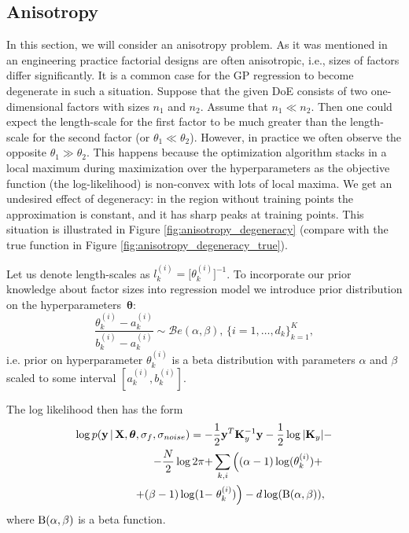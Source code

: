 \subsection{Anisotropy}
In this section, we will consider an anisotropy problem.
As it was mentioned in an engineering practice factorial designs are
often anisotropic, i.e., sizes of factors differ significantly.
It is a common case for the GP regression to become degenerate in such a situation.
Suppose that the given DoE consists of two one-dimensional factors
with sizes $n_1$ and $n_2$.
Assume that $n_1 \ll n_2$.
Then one could expect the length-scale for the first factor to be much greater than
the length-scale for the second factor (or $\theta_1 \ll \theta_2$).
However, in practice we often observe the opposite $\theta_1 \gg \theta_2$.
This happens because the optimization algorithm stacks in a local maximum during maximization over
the hyperparameters as the objective function (the log-likelihood) is non-convex with lots of local maxima.
We get an undesired effect of degeneracy:
in the region without training points the approximation is constant, and it has sharp peaks at training points.
This situation is illustrated in Figure \ref{fig:anisotropy_degeneracy}
(compare with the true function in Figure \ref{fig:anisotropy_degeneracy_true}).

Let us denote length-scales as $l_k^{(i)} = \big [\theta_k^{(i)} \big ]^{-1}$.
To incorporate our prior knowledge about factor sizes into regression model
we introduce prior distribution on the hyperparameters~$\boldsymbol{\theta}$:
\begin{equation}
  \label{eq:prior}
  \frac{\theta_k^{(i)} - a_k^{(i)}}{b_k^{(i)} - a_k^{(i)}} \sim \mathcal{B}e(\alpha, \beta), \, \{ i = 1, \ldots, d_k\}_{k = 1}^K,
\end{equation}
i.e. prior on hyperparameter $\theta_k^{(i)}$ is a beta distribution with parameters $\alpha$
and $\beta$ scaled to some interval $\left [a_k^{(i)}, b_k^{(i)} \right ]$.

The log likelihood then has the form
\begin{equation}
  \label{eq:loglikelihood_prior}
  \begin{split}
    \log p(\mathbf{y} \, | \, \mathbf{X}, \boldsymbol{\theta}, \sigma_f, \sigma_{noise}) = -& \frac12 \mathbf{y}^T \mathbf{K}_y^{-1}\mathbf{y} - \frac12 \log |\mathbf{K}_y| - \\
    - \frac{N}{2} \log 2 \pi + & \sum_{k, i} \left ( (\alpha - 1) \log(\theta_k^{(i)}) + \right . \\
    + (\beta - 1) \log (1 - &  \left . \theta_k^{(i)})  \right ) - d \log({\rm B}(\alpha, \beta)),
  \end{split}
\end{equation}
where ${\rm B}(\alpha, \beta)$ is a beta function.

